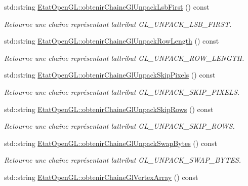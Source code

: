 \begin{DoxyCompactItemize}
std\+::string \hyperlink{group__utilitaire_ga5de4612f68058b5bc47576fc64f97004}{Etat\+Open\+G\+L\+::obtenir\+Chaine\+Gl\+Unpack\+Lsb\+First} () const 
\begin{DoxyCompactList}\small\item\em Retourne une chaîne représentant l\textquotesingle{}attribut G\+L\+\_\+\+U\+N\+P\+A\+C\+K\+\_\+\+L\+S\+B\+\_\+\+F\+I\+R\+S\+T. \end{DoxyCompactList}\item 
std\+::string \hyperlink{group__utilitaire_gaefbf6604571a413d33c117cb1c170a79}{Etat\+Open\+G\+L\+::obtenir\+Chaine\+Gl\+Unpack\+Row\+Length} () const 
\begin{DoxyCompactList}\small\item\em Retourne une chaîne représentant l\textquotesingle{}attribut G\+L\+\_\+\+U\+N\+P\+A\+C\+K\+\_\+\+R\+O\+W\+\_\+\+L\+E\+N\+G\+T\+H. \end{DoxyCompactList}\item 
std\+::string \hyperlink{group__utilitaire_gaa0abd9dc2b1158d657d9553424732bb8}{Etat\+Open\+G\+L\+::obtenir\+Chaine\+Gl\+Unpack\+Skip\+Pixels} () const 
\begin{DoxyCompactList}\small\item\em Retourne une chaîne représentant l\textquotesingle{}attribut G\+L\+\_\+\+U\+N\+P\+A\+C\+K\+\_\+\+S\+K\+I\+P\+\_\+\+P\+I\+X\+E\+L\+S. \end{DoxyCompactList}\item 
std\+::string \hyperlink{group__utilitaire_gaa4065b05943d7e949fd785f85dd3cdc2}{Etat\+Open\+G\+L\+::obtenir\+Chaine\+Gl\+Unpack\+Skip\+Rows} () const 
\begin{DoxyCompactList}\small\item\em Retourne une chaîne représentant l\textquotesingle{}attribut G\+L\+\_\+\+U\+N\+P\+A\+C\+K\+\_\+\+S\+K\+I\+P\+\_\+\+R\+O\+W\+S. \end{DoxyCompactList}\item 
std\+::string \hyperlink{group__utilitaire_gaa9b797c3176f4a4cb2094550ebaab4d9}{Etat\+Open\+G\+L\+::obtenir\+Chaine\+Gl\+Unpack\+Swap\+Bytes} () const 
\begin{DoxyCompactList}\small\item\em Retourne une chaîne représentant l\textquotesingle{}attribut G\+L\+\_\+\+U\+N\+P\+A\+C\+K\+\_\+\+S\+W\+A\+P\+\_\+\+B\+Y\+T\+E\+S. \end{DoxyCompactList}\item 
std\+::string \hyperlink{group__utilitaire_gaaa758212d7a3f274415edbc9e2532289}{Etat\+Open\+G\+L\+::obtenir\+Chaine\+Gl\+Vertex\+Array} () const 

\end{DoxyCompactItemize}
